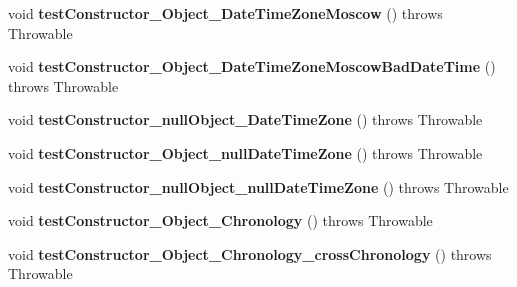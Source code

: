 \begin{DoxyCompactItemize}
\item 
\hypertarget{classorg_1_1joda_1_1time_1_1_test_local_date_time___constructors_afe261b3c9e0235a3594ecfef557294c1}{void {\bfseries test\-Constructor\-\_\-\-Object\-\_\-\-Date\-Time\-Zone\-Moscow} ()  throws Throwable }\label{classorg_1_1joda_1_1time_1_1_test_local_date_time___constructors_afe261b3c9e0235a3594ecfef557294c1}

\item 
\hypertarget{classorg_1_1joda_1_1time_1_1_test_local_date_time___constructors_a4b722294d196d078ff1a51455cb47eaf}{void {\bfseries test\-Constructor\-\_\-\-Object\-\_\-\-Date\-Time\-Zone\-Moscow\-Bad\-Date\-Time} ()  throws Throwable }\label{classorg_1_1joda_1_1time_1_1_test_local_date_time___constructors_a4b722294d196d078ff1a51455cb47eaf}

\item 
\hypertarget{classorg_1_1joda_1_1time_1_1_test_local_date_time___constructors_aab1d28bf08444048cffd6a8c5ff7edc5}{void {\bfseries test\-Constructor\-\_\-null\-Object\-\_\-\-Date\-Time\-Zone} ()  throws Throwable }\label{classorg_1_1joda_1_1time_1_1_test_local_date_time___constructors_aab1d28bf08444048cffd6a8c5ff7edc5}

\item 
\hypertarget{classorg_1_1joda_1_1time_1_1_test_local_date_time___constructors_a8078956b15dd62e289118519e233b416}{void {\bfseries test\-Constructor\-\_\-\-Object\-\_\-null\-Date\-Time\-Zone} ()  throws Throwable }\label{classorg_1_1joda_1_1time_1_1_test_local_date_time___constructors_a8078956b15dd62e289118519e233b416}

\item 
\hypertarget{classorg_1_1joda_1_1time_1_1_test_local_date_time___constructors_ad4dad4805e3bd08347be75645c6970a4}{void {\bfseries test\-Constructor\-\_\-null\-Object\-\_\-null\-Date\-Time\-Zone} ()  throws Throwable }\label{classorg_1_1joda_1_1time_1_1_test_local_date_time___constructors_ad4dad4805e3bd08347be75645c6970a4}

\item 
\hypertarget{classorg_1_1joda_1_1time_1_1_test_local_date_time___constructors_af49d8be39d29613eccc2ad14d82466a0}{void {\bfseries test\-Constructor\-\_\-\-Object\-\_\-\-Chronology} ()  throws Throwable }\label{classorg_1_1joda_1_1time_1_1_test_local_date_time___constructors_af49d8be39d29613eccc2ad14d82466a0}

\item 
\hypertarget{classorg_1_1joda_1_1time_1_1_test_local_date_time___constructors_a4aa2020ea69a3541bc91931bbda2f70c}{void {\bfseries test\-Constructor\-\_\-\-Object\-\_\-\-Chronology\-\_\-cross\-Chronology} ()  throws Throwable }\label{classorg_1_1joda_1_1time_1_1_test_local_date_time___constructors_a4aa2020ea69a3541bc91931bbda2f70c}


\end{DoxyCompactItemize}
